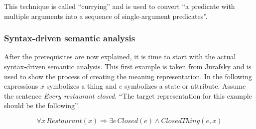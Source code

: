 \documentclass[12pt,twoside]{scrartcl}
\theoremstyle{plain}
\theoremstyle{definition}
\theoremstyle{remark}
\begin{document}
		This technique is called ``currying''\cite[p.~594]{Jurafsky2009a} and is used to convert ``a predicate with multiple arguments into a sequence of single-argument predicates''\cite[p.~594]{Jurafsky2009a}.
		
		\subsubsection*{Syntax-driven semantic analysis}
		\label{subSubSec:syntaxDrivenSemanticAnalysis}
		
		After the prerequisites are now explained, it is time to start with the actual syntax-driven semantic analysis. This first example is taken from Jurafsky and is used to show the process of creating the meaning representation. In the following expressions $x$ symbolizes a thing and $e$ symbolizes a state or attribute. Assume the sentence \textit{Every restaurant closed}. ``The target representation for this example should be the following''\cite[p.~621]{Jurafsky2009}.
		
		\begin{equation}
		\label{eq:tarRep}
			\forall x \,Restaurant(x) \Rightarrow \exists e \,Closed(e) \wedge ClosedThing(e,x)
		\end{equation}
		
\end{document}
